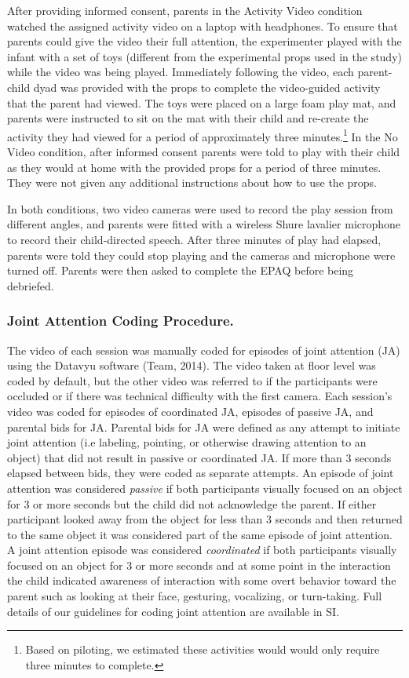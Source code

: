 \documentclass[man,floatsintext]{apa6}
\begin{document}
After providing informed consent, parents in the Activity Video condition watched the assigned activity video on a laptop with headphones.
To ensure that parents could give the video their full attention, the experimenter played with the infant with a set of toys (different from the experimental props used in the study) while the video was being played.
Immediately following the video, each parent-child dyad was provided with the props to complete the video-guided activity that the parent had viewed.
The toys were placed on a large foam play mat, and parents were instructed to sit on the mat with their child and re-create the activity they had viewed for a period of approximately three minutes.\footnote{Based on piloting, we estimated these activities would would only require three minutes to complete.}
In the No Video condition, after informed consent parents were told to play with their child as they would at home with the provided props for a period of three minutes.
They were not given any additional instructions about how to use the props.

In both conditions, two video cameras were used to record the play session from different angles, and parents were fitted with a wireless Shure lavalier microphone to record their child-directed speech.
After three minutes of play had elapsed, parents were told they could stop playing and the cameras and microphone were turned off.
Parents were then asked to complete the EPAQ before being debriefed.

\hypertarget{joint-attention-coding-procedure.}{%
\subsubsection{Joint Attention Coding Procedure.}\label{joint-attention-coding-procedure.}}

The video of each session was manually coded for episodes of joint attention (JA) using the Datavyu software (Team, 2014).
The video taken at floor level was coded by default, but the other video was referred to if the participants were occluded or if there was technical difficulty with the first camera.
Each session's video was coded for episodes of coordinated JA, episodes of passive JA, and parental bids for JA.
Parental bids for JA were defined as any attempt to initiate joint attention (i.e labeling, pointing, or otherwise drawing attention to an object) that did not result in passive or coordinated JA.
If more than 3 seconds elapsed between bids, they were coded as separate attempts.
An episode of joint attention was considered \emph{passive} if both participants visually focused on an object for 3 or more seconds but the child did not acknowledge the parent.
If either participant looked away from the object for less than 3 seconds and then returned to the same object it was considered part of the same episode of joint attention.
A joint attention episode was considered \emph{coordinated} if both participants visually focused on an object for 3 or more seconds and at some point in the interaction the child indicated awareness of interaction with some overt behavior toward the parent such as looking at their face, gesturing, vocalizing, or turn-taking.
Full details of our guidelines for coding joint attention are available in SI.
\end{document}
